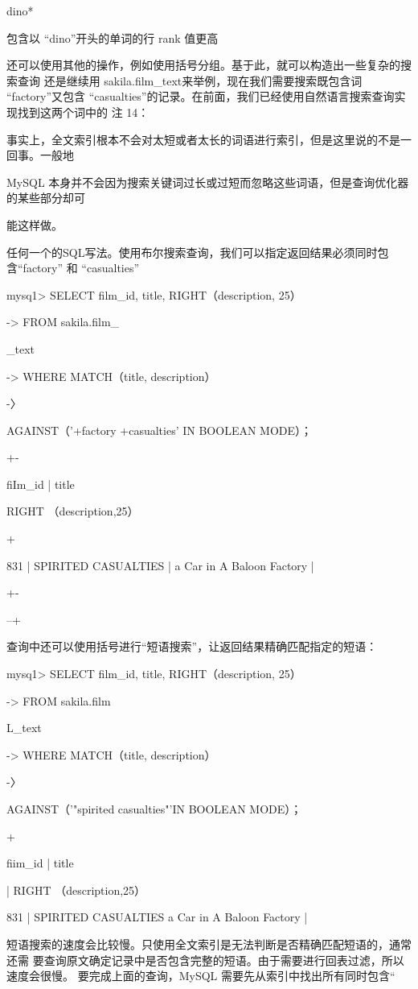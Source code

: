dino*

包含以 “dino”开头的单词的行 rank 值更高

还可以使用其他的操作，例如使用括号分组。基于此，就可以构造出一些复杂的搜索查询
还是继续用 sakila.film\_text来举例，现在我们需要搜索既包含词 “factory”又包含
“casualties”的记录。在前面，我们已经使用自然语言搜索查询实现找到这两个词中的
注 14：

事实上，全文索引根本不会对太短或者太长的词语进行索引，但是这里说的不是一回事。一般地

MySQL 本身并不会因为搜索关键词过长或过短而忽略这些词语，但是查询优化器的某些部分却可

能这样做。

任何一个的SQL写法。使用布尔搜索查询，我们可以指定返回结果必须同时包含“factory”
和 “casualties”

mysq1> SELECT film\_id, title, RIGHT（description, 25）

-> FROM sakila.film\_

\_text

-> WHERE MATCH（title, description）

-〉

AGAINST（'+factory +casualties' IN BOOLEAN MODE）；

+-

fiIm\_id | title

RIGHT （description,25）

+

831 | SPIRITED CASUALTIES | a Car in A Baloon Factory |

+-

--+

查询中还可以使用括号进行“短语搜索”，让返回结果精确匹配指定的短语：

mysq1> SELECT film\_id, title, RIGHT（description, 25）

-> FROM sakila.film

L\_text

-> WHERE MATCH（title, description）

-〉

AGAINST（'"spirited casualties"'IN BOOLEAN MODE）；

+

fiim\_id | title

| RIGHT （description,25）

831 | SPIRITED CASUALTIES a Car in A Baloon Factory |

短语搜索的速度会比较慢。只使用全文索引是无法判断是否精确匹配短语的，通常还需
要查询原文确定记录中是否包含完整的短语。由于需要进行回表过滤，所以速度会很慢。
要完成上面的查询，MySQL 需要先从索引中找出所有同时包含“

